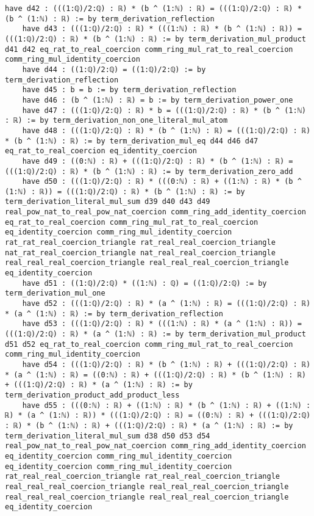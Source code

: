 \documentclass{article}
\begin{document}
\begin{tcolorbox}[colback=white!10, width=\linewidth]
\begin{lstlisting}[language=Lean4]
    have d42 : (((1:ℚ)/2:ℚ) : ℝ) * (b ^ (1:ℕ) : ℝ) = (((1:ℚ)/2:ℚ) : ℝ) * (b ^ (1:ℕ) : ℝ) := by term_derivation_reflection
    have d43 : (((1:ℚ)/2:ℚ) : ℝ) * (((1:ℕ) : ℝ) * (b ^ (1:ℕ) : ℝ)) = (((1:ℚ)/2:ℚ) : ℝ) * (b ^ (1:ℕ) : ℝ) := by term_derivation_mul_product d41 d42 eq_rat_to_real_coercion comm_ring_mul_rat_to_real_coercion comm_ring_mul_identity_coercion
    have d44 : ((1:ℚ)/2:ℚ) = ((1:ℚ)/2:ℚ) := by term_derivation_reflection
    have d45 : b = b := by term_derivation_reflection
    have d46 : (b ^ (1:ℕ) : ℝ) = b := by term_derivation_power_one
    have d47 : (((1:ℚ)/2:ℚ) : ℝ) * b = (((1:ℚ)/2:ℚ) : ℝ) * (b ^ (1:ℕ) : ℝ) := by term_derivation_non_one_literal_mul_atom
    have d48 : (((1:ℚ)/2:ℚ) : ℝ) * (b ^ (1:ℕ) : ℝ) = (((1:ℚ)/2:ℚ) : ℝ) * (b ^ (1:ℕ) : ℝ) := by term_derivation_mul_eq d44 d46 d47 eq_rat_to_real_coercion eq_identity_coercion
    have d49 : ((0:ℕ) : ℝ) + (((1:ℚ)/2:ℚ) : ℝ) * (b ^ (1:ℕ) : ℝ) = (((1:ℚ)/2:ℚ) : ℝ) * (b ^ (1:ℕ) : ℝ) := by term_derivation_zero_add
    have d50 : (((1:ℚ)/2:ℚ) : ℝ) * (((0:ℕ) : ℝ) + ((1:ℕ) : ℝ) * (b ^ (1:ℕ) : ℝ)) = (((1:ℚ)/2:ℚ) : ℝ) * (b ^ (1:ℕ) : ℝ) := by term_derivation_literal_mul_sum d39 d40 d43 d49 real_pow_nat_to_real_pow_nat_coercion comm_ring_add_identity_coercion eq_rat_to_real_coercion comm_ring_mul_rat_to_real_coercion eq_identity_coercion comm_ring_mul_identity_coercion rat_rat_real_coercion_triangle rat_real_real_coercion_triangle nat_rat_real_coercion_triangle nat_real_real_coercion_triangle real_real_real_coercion_triangle real_real_real_coercion_triangle eq_identity_coercion
    have d51 : ((1:ℚ)/2:ℚ) * ((1:ℕ) : ℚ) = ((1:ℚ)/2:ℚ) := by term_derivation_mul_one
    have d52 : (((1:ℚ)/2:ℚ) : ℝ) * (a ^ (1:ℕ) : ℝ) = (((1:ℚ)/2:ℚ) : ℝ) * (a ^ (1:ℕ) : ℝ) := by term_derivation_reflection
    have d53 : (((1:ℚ)/2:ℚ) : ℝ) * (((1:ℕ) : ℝ) * (a ^ (1:ℕ) : ℝ)) = (((1:ℚ)/2:ℚ) : ℝ) * (a ^ (1:ℕ) : ℝ) := by term_derivation_mul_product d51 d52 eq_rat_to_real_coercion comm_ring_mul_rat_to_real_coercion comm_ring_mul_identity_coercion
    have d54 : (((1:ℚ)/2:ℚ) : ℝ) * (b ^ (1:ℕ) : ℝ) + (((1:ℚ)/2:ℚ) : ℝ) * (a ^ (1:ℕ) : ℝ) = ((0:ℕ) : ℝ) + (((1:ℚ)/2:ℚ) : ℝ) * (b ^ (1:ℕ) : ℝ) + (((1:ℚ)/2:ℚ) : ℝ) * (a ^ (1:ℕ) : ℝ) := by term_derivation_product_add_product_less
    have d55 : (((0:ℕ) : ℝ) + ((1:ℕ) : ℝ) * (b ^ (1:ℕ) : ℝ) + ((1:ℕ) : ℝ) * (a ^ (1:ℕ) : ℝ)) * (((1:ℚ)/2:ℚ) : ℝ) = ((0:ℕ) : ℝ) + (((1:ℚ)/2:ℚ) : ℝ) * (b ^ (1:ℕ) : ℝ) + (((1:ℚ)/2:ℚ) : ℝ) * (a ^ (1:ℕ) : ℝ) := by term_derivation_literal_mul_sum d38 d50 d53 d54 real_pow_nat_to_real_pow_nat_coercion comm_ring_add_identity_coercion eq_identity_coercion comm_ring_mul_identity_coercion eq_identity_coercion comm_ring_mul_identity_coercion rat_real_real_coercion_triangle rat_real_real_coercion_triangle real_real_real_coercion_triangle real_real_real_coercion_triangle real_real_real_coercion_triangle real_real_real_coercion_triangle eq_identity_coercion

\end{lstlisting}
\end{tcolorbox}
\end{document}
